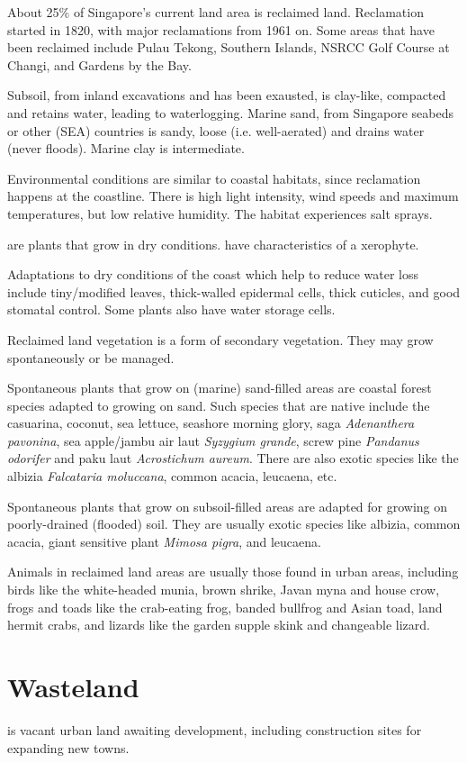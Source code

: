 \documentclass{slnotes}
\newcommand{\scn}[1]{\textit{#1}}
\begin{document}
About 25\% of Singapore's current land area is reclaimed land. Reclamation started in 1820, with major reclamations from 1961 on. Some areas that have been reclaimed include Pulau Tekong, Southern Islands, NSRCC Golf Course at Changi, and Gardens by the Bay.

Subsoil, from inland excavations and has been exausted, is clay-like, compacted and retains water, leading to waterlogging. Marine sand, from Singapore seabeds or other (SEA) countries is sandy, loose (i.e. well-aerated) and drains water (never floods). Marine clay is intermediate.

Environmental conditions are similar to coastal habitats, since reclamation happens at the coastline. There is high light intensity, wind speeds and maximum temperatures, but low relative humidity. The habitat experiences salt sprays.

 are plants that grow in dry conditions.  have characteristics of a xerophyte.

Adaptations to dry conditions of the coast which help to reduce water loss include tiny/modified leaves, thick-walled epidermal cells, thick cuticles, and good stomatal control. Some plants also have water storage cells.

Reclaimed land vegetation is a form of secondary vegetation. They may grow spontaneously or be managed.

Spontaneous plants that grow on (marine) sand-filled areas are coastal forest species adapted to growing on sand. Such species that are native include the casuarina, coconut, sea lettuce, seashore morning glory, saga \scn{Adenanthera pavonina}, sea apple/jambu air laut \scn{Syzygium grande}, screw pine \scn{Pandanus odorifer} and paku laut \scn{Acrostichum aureum}. There are also exotic species like the albizia \scn{Falcataria moluccana}, common acacia, leucaena, etc.

Spontaneous plants that grow on subsoil-filled areas are adapted for growing on poorly-drained (flooded) soil. They are usually exotic species like albizia, common acacia, giant sensitive plant \scn{Mimosa pigra}, and leucaena.

Animals in reclaimed land areas are usually those found in urban areas, including birds like the white-headed munia, brown shrike, Javan myna and house crow, frogs and toads like the crab-eating frog, banded bullfrog and Asian toad, land hermit crabs, and lizards like the garden supple skink and changeable lizard.
\section{Wasteland}
 is vacant urban land awaiting development, including construction sites for expanding new towns.
\end{document}
